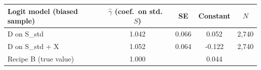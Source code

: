 \begin{tabular}{lcccc}
\toprule
Logit model (biased sample) & $\hat\gamma$ (coef.\ on std.\ $S$) & SE & Constant & $N$\\
\midrule
D on S\_std & 1.042 & 0.066 & 0.052 & 2,740\\
D on S\_std + X & 1.052 & 0.064 & -0.122 & 2,740\\
Recipe B (true value) & 1.000 & & 0.044 & \\
\bottomrule
\end{tabular}

